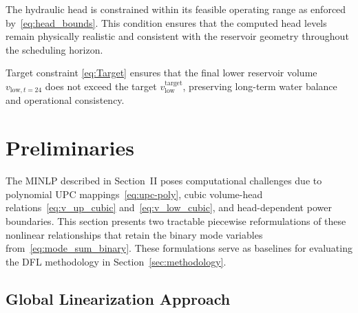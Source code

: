\documentclass[journal]{IEEEtran}
\begin{document}
The hydraulic head is constrained within its feasible operating range as enforced by~\eqref{eq:head_bounds}. This condition ensures that the computed head levels remain physically realistic and consistent with the reservoir geometry throughout the scheduling horizon.

Target constraint \eqref{eq:Target} ensures that the final lower reservoir volume $v_{\text{low},t=24}$ does not exceed the target $v_{\text{low}}^{\text{target}}$, preserving long-term water balance and operational consistency.

\section{Preliminaries}
\label{sec:preliminaries}

The MINLP described in Section~II poses computational challenges due to polynomial UPC mappings~\eqref{eq:upc-poly}, cubic volume-head relations~\eqref{eq:v_up_cubic} and~\eqref{eq:v_low_cubic}, and head-dependent power boundaries. This section presents two tractable piecewise reformulations of these nonlinear relationships that retain the binary mode variables from~\eqref{eq:mode_sum_binary}. These formulations serve as baselines for evaluating the DFL methodology in Section~\ref{sec:methodology}.

\subsection{Global Linearization Approach}
\end{document}

